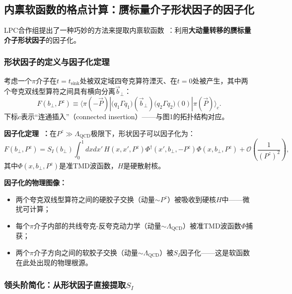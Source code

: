 \documentclass[12pt,a4paper]{ctexart}
\theoremstyle{definition}
\begin{document}
\subsection{内禀软函数的格点计算：赝标量介子形状因子的因子化}

LPC合作组提出了一种巧妙的方法来提取内禀软函数~\cite{LPC2020soft,Chu2023soft}：利用\textbf{大动量转移的赝标量介子形状因子}的因子化。

\subsubsection{形状因子的定义与因子化定理}

考虑一个$\pi$介子在$t = t_{\text{sink}}$处被双定域四夸克算符湮灭、在$t=0$处被产生，其中两个夸克双线型算符之间具有横向分离$\vec{b}_\perp$：
\begin{equation}
F(b_\perp, P^z) \equiv \langle \pi(-\vec{P}) | \big(q_1\Gamma q_1\big)(\vec{b}_\perp) \big(q_2\Gamma q_2\big)(0) | \pi(\vec{P}) \rangle_c.
\label{eq:form_factor_def}
\end{equation}
下标$c$表示``连通插入''（connected insertion）——与图1的拓扑结构对应。

\textbf{因子化定理~\cite{LPC2020soft}：}在$P^z \gg \Lambda_{\text{QCD}}$极限下，形状因子可以因子化为：
\begin{equation}
\boxed{F(b_\perp, P^z) = S_I(b_\perp) \int_0^1 dx dx'\, H(x, x', P^z) \Phi^\dagger(x', b_\perp, -P^z) \Phi(x, b_\perp, P^z) + \mathcal{O}\!\left(\frac{1}{(P^z)^2}\right)},
\label{eq:FF_factorization_main}
\end{equation}
其中$\Phi(x, b_\perp, P^z)$是准TMD波函数，$H$是硬散射核。

\textbf{因子化的物理图像：}
\begin{itemize}
    \item 两个夸克双线型算符之间的硬胶子交换（动量$\sim P^z$）被吸收到硬核$H$中——微扰可计算；
    \item 每个$\pi$介子内部的共线夸克-反夸克动力学（动量$\sim \Lambda_{\text{QCD}}$）被准TMD波函数$\Phi$捕获；
    \item 两个$\pi$介子方向之间的软胶子交换（动量$\sim \Lambda_{\text{QCD}}$）被$S_I$因子化——这是软函数在此处出现的物理根源。
\end{itemize}

\subsubsection{领头阶简化：从形状因子直接提取$S_I$}
\end{document}
